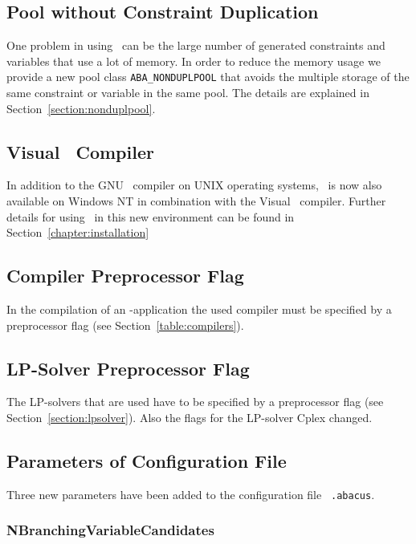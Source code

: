 \subsection{Pool without Constraint Duplication}

One problem in using \ABACUS\ can be the large number of generated
constraints and variables that use a lot of memory. In order to reduce
the memory usage we provide a new pool class 
{\tt ABA\_NONDUPLPOOL}
that avoids the
multiple storage of the same constraint or variable in the same pool.
The details are explained in Section~\ref{section:nonduplpool}.

\subsection{Visual \CPLUSPLUS\ Compiler}

In addition to the GNU \CPLUSPLUS\ compiler on UNIX operating
systems, \ABACUS\ is now also available on Windows NT in combination with
the Visual \CPLUSPLUS\ compiler. 
Further details for using \ABACUS\ in this new environment can be found
in Section~\ref{chapter:installation}

\subsection{Compiler Preprocessor Flag}

In the compilation of an \ABACUS-application the used compiler must be
specified by a preprocessor flag (see Section~\ref{table:compilers}).

\subsection{LP-Solver Preprocessor Flag}

The LP-solvers that are used have to be specified by a preprocessor
flag (see Section~\ref{section:lpsolver}). Also the flags for the
LP-solver Cplex changed.

\subsection{Parameters of Configuration File}

Three new parameters have been added to the configuration file {\tt
.abacus}.

\subsubsection{NBranchingVariableCandidates}

